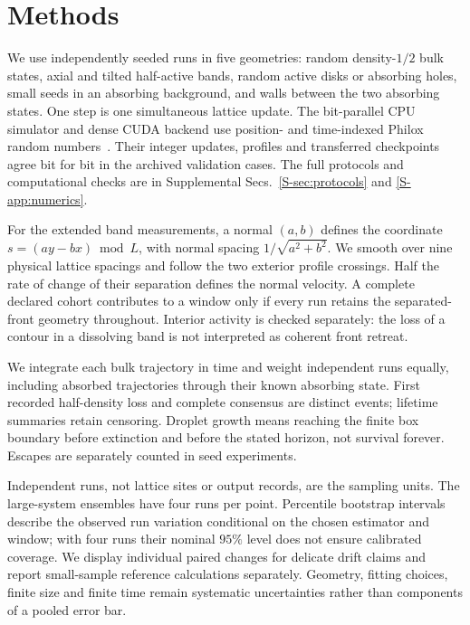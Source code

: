 \section{Methods}
\label{sec:methods}

We use independently seeded runs in five geometries: random density-$1/2$
bulk states, axial and tilted half-active bands, random active disks or
absorbing holes, small seeds in an absorbing background, and walls between
the two absorbing states. One step is one simultaneous lattice update.
The bit-parallel CPU simulator and dense CUDA backend use position- and
time-indexed Philox random numbers~\cite{salmon2011}. Their integer updates,
profiles and transferred checkpoints agree bit for bit in the archived
validation cases. The full protocols and computational checks are in
Supplemental Secs.~\ref{S-sec:protocols} and \ref{S-app:numerics}.

For the extended band measurements, a normal $(a,b)$ defines the coordinate
$s=(ay-bx)\bmod L$, with normal spacing $1/\sqrt{a^2+b^2}$.
We smooth over nine physical lattice spacings and follow the two exterior
profile crossings. Half the rate of change of their separation defines
the normal velocity. A complete declared cohort contributes to a window
only if every run retains the separated-front geometry throughout.
Interior activity is checked separately: the loss of a contour in a
dissolving band is not interpreted as coherent front retreat.

We integrate each bulk trajectory in time and weight independent runs
equally, including absorbed trajectories through their known absorbing
state. First recorded half-density loss and complete consensus are distinct
events; lifetime summaries retain censoring. Droplet growth means reaching
the finite box boundary before extinction and before the stated horizon,
not survival forever. Escapes are separately counted in seed experiments.

Independent runs, not lattice sites or output records, are the sampling
units. The large-system ensembles have four runs per point. Percentile
bootstrap intervals describe the observed run variation conditional on the
chosen estimator and window; with four runs their nominal $95\%$ level
does not ensure calibrated coverage. We display individual paired changes
for delicate drift claims and report small-sample reference calculations
separately. Geometry, fitting choices, finite size and finite time remain
systematic uncertainties rather than components of a pooled error bar.
